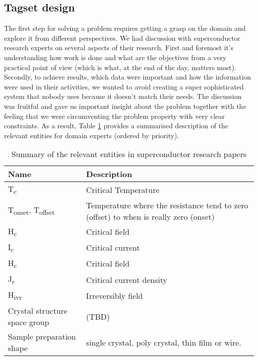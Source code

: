 \documentclass{article}
\begin{document}
\subsection{Tagset design}
The first step for solving a problem requires getting a grasp on the domain and explore it from different perspectives. 
We had discussion with superconductor research experts on several aspects of their research. First and foremost it's understanding how work is done and what are the objectives from a very practical point of view (which is what, at the end of the day, matters most). Secondly, to achieve results, which data were important and how the information were used in their activities, we wanted to avoid creating a super sophisticated system that nobody uses because it doesn't match their needs. 
The discussion was fruitful and gave us important insight about the problem together with the feeling that we were circumventing the problem property with very clear constraints. 
As a result, Table \ref{table:summary-entities-superconductor} provides a summarised description of the relevant entities for domain experts (ordered by priority).

\begin{table}[h!]
    \centering
    \begin{tabular}{ | m{5em} | m{8cm}| } 
    \hline
        Name & Description  \\ [0.5ex] 
    \hline\hline
        T\textsubscript{c} & Critical Temperature\\ 
    \hline
        T\textsubscript{onset}, T\textsubscript{offset} & Temperature where the resistance tend to zero (offset) to when is really zero (onset)\\ 
    \hline
        H\textsubscript{c} & Critical field\\ 
    \hline
        I\textsubscript{c} & Critical current\\
    \hline
        H\textsubscript{c} & Critical field\\ 
    \hline
        J\textsubscript{c} & Critical current density\\ 
    \hline
        H\textsubscript{ivr} & Irreversibly field\\
    \hline
        Crystal structure space group & (TBD) \\
    \hline
        Sample preparation shape & single crystal, poly crystal, thin film or wire. \\
    \hline    
    \end{tabular}
    \caption{Summary of the relevant entities in superconductor research papers}
    \label{table:summary-entities-superconductor}
\end{table}
\end{document}
